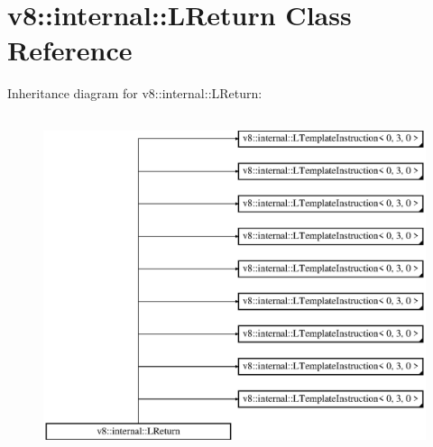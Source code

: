 \hypertarget{classv8_1_1internal_1_1_l_return}{}\section{v8\+:\+:internal\+:\+:L\+Return Class Reference}
\label{classv8_1_1internal_1_1_l_return}
Inheritance diagram for v8\+:\+:internal\+:\+:L\+Return\+:\begin{figure}[H]
\begin{center}
\leavevmode
\includegraphics[height=10.000000cm]{classv8_1_1internal_1_1_l_return}
\end{center}
\end{figure}
